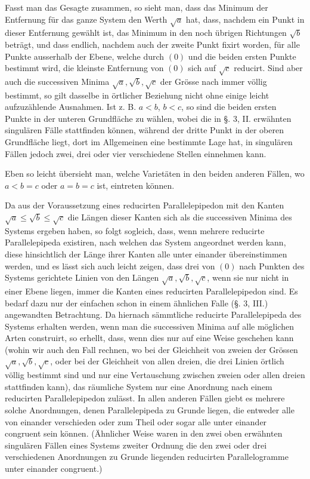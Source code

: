 \documentclass[11pt]{article}
\begin{document}
Fasst man das Gesagte zusammen, so sieht man, dass das Minimum der Entfernung für das ganze System den Werth $\sqrt a$ hat, dass, nachdem ein Punkt in dieser Entfernung gewählt ist, das Minimum in den noch übrigen Richtungen $\sqrt b$ beträgt, und dass endlich, nachdem auch der zweite Punkt fixirt worden, für alle Punkte ausserhalb der Ebene, welche durch $(0)$ und die beiden ersten Punkte bestimmt wird, die kleinste Entfernung von $(0)$ sich auf $\sqrt c$ reducirt. Sind aber auch die successiven Minima $\sqrt a,\sqrt b,\sqrt c$ der Grösse nach immer völlig bestimmt, so gilt dasselbe in örtlicher Beziehung nicht ohne einige leicht aufzuzählende Ausnahmen. Ist z. B. $a<b$, $b<c$, so sind die beiden ersten Punkte in der unteren Grundfläche zu wählen, wobei die in §. 3, II. erwähnten singulären Fälle stattfinden können, während der dritte Punkt in der oberen Grundfläche liegt, dort im Allgemeinen eine bestimmte Lage hat, in singulären Fällen jedoch zwei, drei oder vier verschiedene Stellen einnehmen kann.

Eben so leicht übersieht man, welche Varietäten in den beiden anderen Fällen, wo $a<b=c$ oder $a=b=c$ ist, eintreten können.

Da aus der Voraussetzung eines reducirten Parallelepipedon mit den Kanten $\sqrt a\le\sqrt b\le\sqrt c$ die Längen dieser Kanten sich als die successiven Minima des Systems ergeben haben, so folgt sogleich, dass, wenn mehrere reducirte Parallelepipeda existiren, nach welchen das System angeordnet werden kann, diese hinsichtlich der Länge ihrer Kanten alle unter einander übereinstimmen werden, und es lässt sich auch leicht zeigen, dass drei von $(0)$ nach Punkten des Systems gerichtete Linien von den Längen $\sqrt a,\sqrt b,\sqrt c$, wenn sie nur nicht in einer Ebene liegen, immer die Kanten eines reducirten Parallelepipedon sind. Es bedarf dazu nur der einfachen schon in einem ähnlichen Falle (§. 3, III.) angewandten Betrachtung. Da hiernach sämmtliche reducirte Parallelepipeda des Systems erhalten werden, wenn man die successiven Minima auf alle möglichen Arten construirt, so erhellt, dass, wenn dies nur auf eine Weise geschehen kann (wohin wir auch den Fall rechnen, wo bei der Gleichheit von zweien der Grössen $\sqrt a,\sqrt b,\sqrt c$, oder bei der Gleichheit von allen dreien, die drei Linien örtlich völlig bestimmt sind und nur eine Vertauschung zwischen zweien oder allen dreien stattfinden kann), das räumliche System nur eine Anordnung nach einem reducirten Parallelepipedon zulässt. In allen anderen Fällen giebt es mehrere solche Anordnungen, denen Parallelepipeda zu Grunde liegen, die entweder alle von einander verschieden oder zum Theil oder sogar alle unter einander congruent sein können. (Ähnlicher Weise waren in den zwei oben erwähnten singulären Fällen eines Systems zweiter Ordnung die den zwei oder drei verschiedenen Anordnungen zu Grunde liegenden reducirten Parallelogramme unter einander congruent.)
\end{document}
